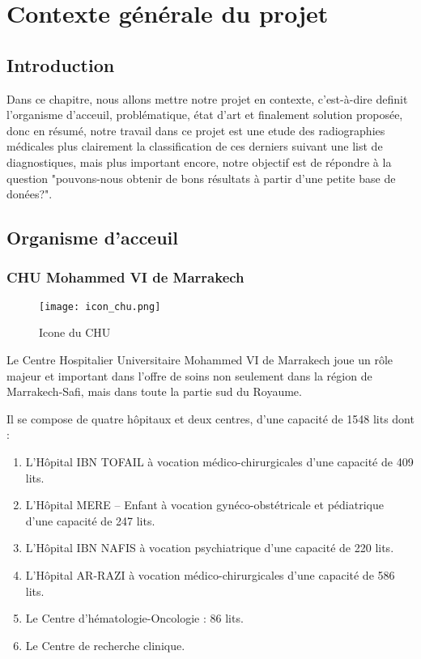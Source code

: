 \chapter{Contexte générale du projet}

    \section*{Introduction}
        Dans ce chapitre, nous allons mettre notre projet en contexte, c'est-à-dire definit l'organisme d'acceuil, problématique, état d'art et finalement solution proposée, donc en résumé, notre travail dans ce projet est une etude des radiographies médicales plus clairement la classification de ces derniers suivant une list de diagnostiques, mais plus important encore, notre objectif est de répondre à la question "pouvons-nous obtenir de bons résultats à partir d'une petite base de donées?".

    \section{Organisme d'acceuil}

        \subsection{CHU Mohammed VI de Marrakech}
            \begin{figure}[h]
                \centering
                \texttt{[image: icon\_chu.png]}\label{fig:chu}
                \caption{Icone du CHU}
            \end{figure}
            Le Centre Hospitalier Universitaire Mohammed VI de Marrakech joue un rôle  majeur et important dans l’offre de soins non seulement dans la région de Marrakech-Safi, mais  dans toute la partie sud du Royaume.

            Il se compose de quatre hôpitaux et deux centres, d’une capacité de 1548 lits dont :
            \begin{enumerate}
                    \item L’Hôpital IBN TOFAIL à vocation médico-chirurgicales d’une capacité de 409 lits.
                    \item L’Hôpital MERE – Enfant à vocation gynéco-obstétricale et pédiatrique d’une capacité de 247 lits.
                    \item L’Hôpital IBN NAFIS à vocation psychiatrique d’une capacité de 220 lits.
                    \item L’Hôpital AR-RAZI à vocation médico-chirurgicales d’une capacité de 586 lits.
                    \item Le Centre d'hématologie-Oncologie : 86 lits.
                    \item Le Centre de recherche clinique.
            \end{enumerate}

